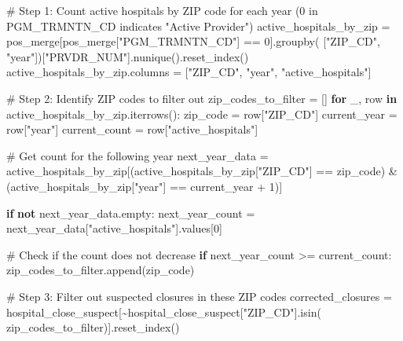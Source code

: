 \documentclass[
  letterpaper,
  DIV=11,
  numbers=noendperiod]{scrartcl}
\newenvironment{Shaded}{\begin{snugshade}}{\end{snugshade}}
\newcommand{\CommentTok}[1]{\textcolor[rgb]{0.37,0.37,0.37}{#1}}
\newcommand{\ControlFlowTok}[1]{\textcolor[rgb]{0.00,0.23,0.31}{\textbf{#1}}}
\newcommand{\DecValTok}[1]{\textcolor[rgb]{0.68,0.00,0.00}{#1}}
\newcommand{\KeywordTok}[1]{\textcolor[rgb]{0.00,0.23,0.31}{\textbf{#1}}}
\newcommand{\NormalTok}[1]{\textcolor[rgb]{0.00,0.23,0.31}{#1}}
\newcommand{\OperatorTok}[1]{\textcolor[rgb]{0.37,0.37,0.37}{#1}}
\newcommand{\StringTok}[1]{\textcolor[rgb]{0.13,0.47,0.30}{#1}}
\begin{document}
\begin{Shaded}
\begin{Highlighting}[]
\CommentTok{\# Step 1: Count active hospitals by ZIP code for each year (0 in PGM\_TRMNTN\_CD indicates "Active Provider")}
\NormalTok{active\_hospitals\_by\_zip }\OperatorTok{=}\NormalTok{ pos\_merge[pos\_merge[}\StringTok{"PGM\_TRMNTN\_CD"}\NormalTok{] }\OperatorTok{==} \DecValTok{0}\NormalTok{].groupby(}
\NormalTok{    [}\StringTok{"ZIP\_CD"}\NormalTok{, }\StringTok{"year"}\NormalTok{])[}\StringTok{"PRVDR\_NUM"}\NormalTok{].nunique().reset\_index()}
\NormalTok{active\_hospitals\_by\_zip.columns }\OperatorTok{=}\NormalTok{ [}\StringTok{"ZIP\_CD"}\NormalTok{, }\StringTok{"year"}\NormalTok{, }\StringTok{"active\_hospitals"}\NormalTok{]}

\CommentTok{\# Step 2: Identify ZIP codes to filter out}
\NormalTok{zip\_codes\_to\_filter }\OperatorTok{=}\NormalTok{ []}
\ControlFlowTok{for}\NormalTok{ \_, row }\KeywordTok{in}\NormalTok{ active\_hospitals\_by\_zip.iterrows():}
\NormalTok{    zip\_code }\OperatorTok{=}\NormalTok{ row[}\StringTok{"ZIP\_CD"}\NormalTok{]}
\NormalTok{    current\_year }\OperatorTok{=}\NormalTok{ row[}\StringTok{"year"}\NormalTok{]}
\NormalTok{    current\_count }\OperatorTok{=}\NormalTok{ row[}\StringTok{"active\_hospitals"}\NormalTok{]}

    \CommentTok{\# Get count for the following year}
\NormalTok{    next\_year\_data }\OperatorTok{=}\NormalTok{ active\_hospitals\_by\_zip[(active\_hospitals\_by\_zip[}\StringTok{"ZIP\_CD"}\NormalTok{] }\OperatorTok{==}\NormalTok{ zip\_code) }\OperatorTok{\&}
\NormalTok{                                             (active\_hospitals\_by\_zip[}\StringTok{"year"}\NormalTok{] }\OperatorTok{==}\NormalTok{ current\_year }\OperatorTok{+} \DecValTok{1}\NormalTok{)]}

    \ControlFlowTok{if} \KeywordTok{not}\NormalTok{ next\_year\_data.empty:}
\NormalTok{        next\_year\_count }\OperatorTok{=}\NormalTok{ next\_year\_data[}\StringTok{"active\_hospitals"}\NormalTok{].values[}\DecValTok{0}\NormalTok{]}

        \CommentTok{\# Check if the count does not decrease}
        \ControlFlowTok{if}\NormalTok{ next\_year\_count }\OperatorTok{\textgreater{}=}\NormalTok{ current\_count:}
\NormalTok{            zip\_codes\_to\_filter.append(zip\_code)}

\CommentTok{\# Step 3: Filter out suspected closures in these ZIP codes}
\NormalTok{corrected\_closures }\OperatorTok{=}\NormalTok{ hospital\_close\_suspect[}\OperatorTok{\textasciitilde{}}\NormalTok{hospital\_close\_suspect[}\StringTok{"ZIP\_CD"}\NormalTok{].isin(}
\NormalTok{    zip\_codes\_to\_filter)].reset\_index()}
\end{Highlighting}
\end{Shaded}
\end{document}

